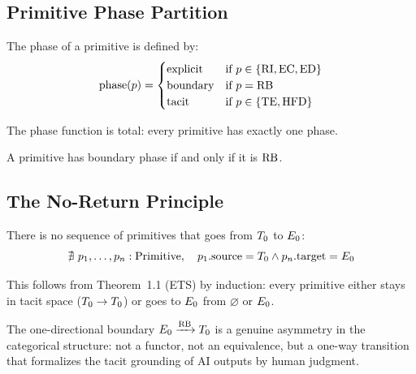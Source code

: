 \subsection{Primitive Phase Partition}

\begin{definition}
The phase of a primitive is defined by:
\[
  \mathrm{phase}(p) =
  \begin{cases}
    \text{explicit}  & \text{if } p \in \{\mathrm{RI}, \mathrm{EC}, \mathrm{ED}\} \\
    \text{boundary}  & \text{if } p = \mathrm{RB} \\
    \text{tacit}     & \text{if } p \in \{\mathrm{TE}, \mathrm{HFD}\}
  \end{cases}
\]
\end{definition}

\begin{theorem}
The phase function is total: every primitive has exactly one phase.
\end{theorem}

\begin{theorem}
A primitive has boundary phase if and only if it is $\mathrm{RB}$.
\end{theorem}

\subsection{The No-Return Principle}

\begin{theorem}
There is no sequence of primitives that goes from $T_0$ to $E_0$:
\[
  \nexists\ p_1, \ldots, p_n : \mathrm{Primitive},\quad
  p_1.\mathrm{source} = T_0 \wedge p_n.\mathrm{target} = E_0
\]
\end{theorem}

This follows from Theorem~1.1 (ETS) by induction: every primitive either stays
in tacit space ($T_0 \to T_0$) or goes to $E_0$ from $\varnothing$ or
$E_0$.

The one-directional boundary
$E_0 \xrightarrow{\mathrm{RB}} T_0$ is a genuine asymmetry in the categorical
structure: not a functor, not an equivalence, but a one-way transition that
formalizes the tacit grounding of AI outputs by human judgment.

